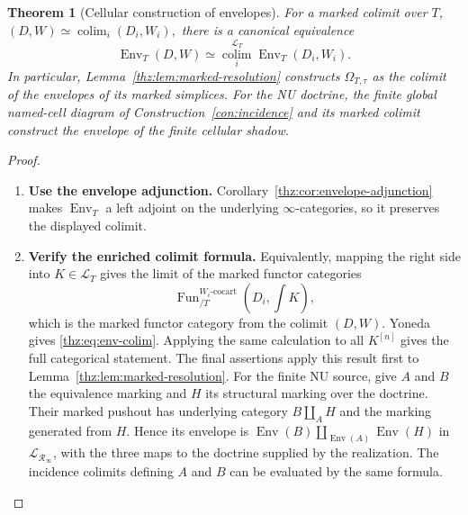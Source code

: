 \documentclass[oneside]{article}
\theoremstyle{plain}
\newtheorem{theorem}{Theorem}[section]
\theoremstyle{definition}
\theoremstyle{remark}
\newcommand{\Env}{\operatorname{Env}}
\newcommand{\Fun}{\operatorname{Fun}}
\newcommand{\RNU}{\mathcal R_{\infty}}
\newcommand{\coc}{\mathrm{cocart}}
\begin{document}
\begin{theorem}[Cellular construction of envelopes]\label{thz:thm:cellular}
For a marked colimit over $T$, $(D,W)\simeq\operatorname*{colim}_i(D_i,W_i),$ there is a canonical equivalence
\begin{equation}\label{thz:eq:env-colim}
 \Env_T(D,W)
 \simeq
 \operatorname*{colim}^{\mathcal L_T}_i
 \Env_T(D_i,W_i).
\end{equation}
In particular, Lemma~\ref{thz:lem:marked-resolution} constructs
$\Omega_{T,\tau}$ as the colimit of the envelopes of its marked simplices.
For the NU doctrine, the finite global named-cell diagram of
Construction~\ref{con:incidence} and its marked colimit construct the
envelope of the finite cellular shadow.
\end{theorem}
\begin{proof}
\leavevmode
\begin{enumerate}
\item \textbf{Use the envelope adjunction.} Corollary~\ref{thz:cor:envelope-adjunction} makes $\Env_T$ a left adjoint on the underlying $\infty$-categories, so it preserves the
displayed colimit.
\item \textbf{Verify the enriched colimit formula.} Equivalently, mapping the right side into $K\in\mathcal L_T$ gives the
limit of the marked functor categories
\[
 \Fun^{W_i\text{-}\coc}_{/T}
   (D_i,\textstyle\int K),
\]
which is the marked functor category from the colimit $(D,W)$.  Yoneda
gives \eqref{thz:eq:env-colim}.  Applying the same calculation to all
$K^{[n]}$ gives the full categorical statement.  The final assertions
apply this result first to Lemma~\ref{thz:lem:marked-resolution}.
For the finite NU source, give $A$ and $B$ the equivalence marking
and $H$ its structural marking over the doctrine. Their marked pushout
has underlying category $B\amalg_A H$ and the marking generated from
$H$. Hence its envelope is
$\Env(B)\amalg_{\Env(A)}\Env(H)$ in $\mathcal L_{\RNU}$, with the
three maps to the doctrine supplied by the realization. The incidence
colimits defining $A$ and $B$ can be evaluated by the same formula.\qedhere
\end{enumerate}
\end{proof}
\end{document}
